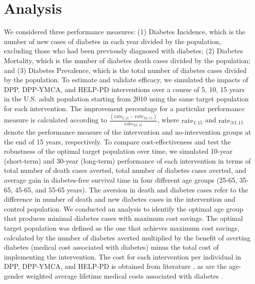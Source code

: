 \documentclass[fleqn,10pt]{wlscirep}
\begin{document}
\section*{Analysis}
We considered three performance measures: (1) Diabetes Incidence, which is the number of new cases of diabetes in each year divided by the population, excluding those who had been previously diagnosed with diabetes; (2) Diabetes Mortality, which is the number of diabetes death cases divided by the population; and (3) Diabetes Prevalence, which is the total number of diabetes cases divided by the population. 
To estimate and validate efficacy, we simulated the impacts of DPP, DPP-YMCA, and HELP-PD interventions over a course of 5, 10, 15 years in the U.S. adult population starting from 2010 using the same target population for each intervention. The improvement percentage for a particular performance measure is calculated according to $\frac{(\text{rate}_{I,15}-\text{rate}_{NI,15})}{\text{rate}_{NI,15}}$, where $\text{rate}_{I,15}$ and $\text{rate}_{NI,15}$ denote the performance measure of the intervention and no-intervention groups at the end of 15 years, respectively.
To compare cost-effectiveness and test the robustness of the optimal target population over time, we simulated 10-year (short-term) and 30-year (long-term) performance of each intervention in terms of total number of death cases averted, total number of diabetes cases averted, and average gain in diabetes-free survival time in four different age groups (25-65, 35-65, 45-65, and 55-65 years). The aversion in death and diabetes cases refer to the difference in number of death and new diabetes cases in the intervention and control population.
We conducted an analysis to identify the optimal age group that produces minimal diabetes cases with maximum cost savings. The optimal target population was defined as the one that achieves maximum cost savings, calculated by the number of diabetes averted multiplied by the benefit of averting diabetes (medical cost associated with diabetes) minus the total cost of implementing the intervention. The cost for each intervention per individual in DPP, DPP-YMCA, and HELP-PD is obtained from literature \cite{group:costs:2003,ackermann:adapting:2007,lawlor:cost:2013}, as are the age-gender weighted average lifetime medical costs associated with diabetes \cite{zhuo:lifetime:2013}.
\end{document}
